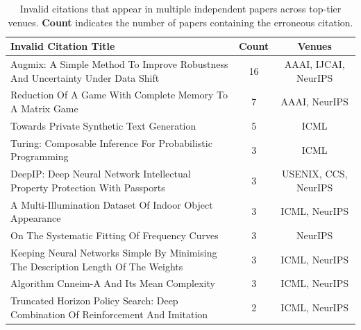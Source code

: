 \begin{table}[t]
  \centering
  \begin{threeparttable}
    \caption{Invalid citations that appear in multiple independent papers across top-tier venues. \textbf{Count} indicates the number of papers containing the erroneous citation.}
    \label{tab:repeated_citation_errors}
    \small
{}
\begin{tabular}{p{12cm}cc}
\toprule
\textbf{Invalid Citation Title} & \cellcolor{red!12}\textbf{Count} & \textbf{Venues} \\
\midrule
Augmix: A Simple Method To Improve Robustness And Uncertainty Under Data Shift & \cellcolor{red!30}16 & AAAI, IJCAI, NeurIPS \\
Reduction Of A Game With Complete Memory To A Matrix Game & \cellcolor{red!18}7 & AAAI, NeurIPS \\
Towards Private Synthetic Text Generation & \cellcolor{red!14}5 & ICML \\
Turing: Composable Inference For Probabilistic Programming & \cellcolor{red!10}3 & ICML \\
DeepIP: Deep Neural Network Intellectual Property Protection With Passports & \cellcolor{red!10}3 & USENIX, CCS, NeurIPS \\
A Multi-Illumination Dataset Of Indoor Object Appearance & \cellcolor{red!10}3 & ICML, NeurIPS \\
On The Systematic Fitting Of Frequency Curves & \cellcolor{red!10}3 & NeurIPS \\
Keeping Neural Networks Simple By Minimising The Description Length Of The Weights & \cellcolor{red!10}3 & ICML, NeurIPS \\
Algorithm Cnneim-A And Its Mean Complexity & \cellcolor{red!10}3 & ICML, NeurIPS \\
Truncated Horizon Policy Search: Deep Combination Of Reinforcement And Imitation & \cellcolor{red!8}2 & ICML, NeurIPS \\
\bottomrule
\end{tabular}
  \end{threeparttable}
\end{table}

